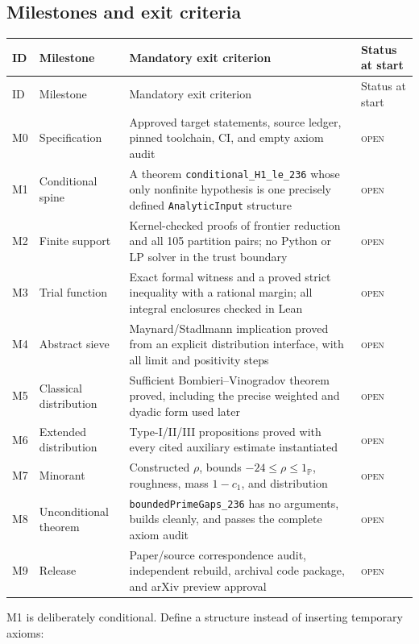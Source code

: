 \documentclass[11pt]{article}
\newcommand{\leanname}[1]{\texttt{#1}}
\newcommand{\todo}{\textsc{open}}
\begin{document}
\subsection{Milestones and exit criteria}

\begin{longtable}{p{}p{}p{}p{}}
\toprule
ID & Milestone & Mandatory exit criterion & Status at start \\
\midrule
\endfirsthead
\toprule
ID & Milestone & Mandatory exit criterion & Status at start \\
\midrule
\endhead
M0 & Specification & Approved target statements, source ledger, pinned
toolchain, CI, and empty axiom audit & \todo \\
M1 & Conditional spine & A theorem
\leanname{conditional\_H1\_le\_236} whose only nonfinite hypothesis is one
precisely defined \leanname{AnalyticInput} structure & \todo \\
M2 & Finite support & Kernel-checked proofs of frontier reduction and all 105
partition pairs; no Python or LP solver in the trust boundary & \todo \\
M3 & Trial function & Exact formal witness and a proved strict inequality with
a rational margin; all integral enclosures checked in Lean & \todo \\
M4 & Abstract sieve & Maynard/Stadlmann implication proved from an explicit
distribution interface, with all limit and positivity steps & \todo \\
M5 & Classical distribution & Sufficient Bombieri--Vinogradov theorem proved,
including the precise weighted and dyadic form used later & \todo \\
M6 & Extended distribution & Type-I/II/III propositions proved with every
cited auxiliary estimate instantiated & \todo \\
M7 & Minorant & Constructed \(\rho\), bounds \(-24\leq\rho\leq1_{\mathbb P}\),
roughness, mass \(1-c_1\), and distribution & \todo \\
M8 & Unconditional theorem & \leanname{boundedPrimeGaps\_236} has no arguments,
builds cleanly, and passes the complete axiom audit & \todo \\
M9 & Release & Paper/source correspondence audit, independent rebuild,
archival code package, and arXiv preview approval & \todo \\
\bottomrule
\end{longtable}

M1 is deliberately conditional.  Define a structure instead of inserting
temporary axioms:
\end{document}
